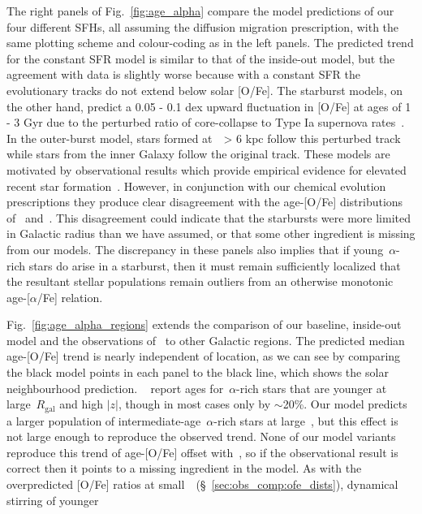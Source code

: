 \documentclass[draft2.tex]{subfiles}
\begin{document}
The right panels of Fig.~\ref{fig:age_alpha} compare the model predictions of 
our four different SFHs, all assuming the diffusion migration prescription, 
with the same plotting scheme and colour-coding as in the left panels. 
The predicted trend for the constant SFR model is similar to that of the 
inside-out model, but the agreement with data is slightly worse because with a 
constant SFR the evolutionary tracks do not extend below solar [O/Fe]. 
The starburst models, on the other hand, predict a 0.05 - 0.1 dex upward 
fluctuation in [O/Fe] at ages of 1 - 3 Gyr due to the perturbed ratio of 
core-collapse to Type Ia supernova rates~\citep{Johnson2020}. 
In the outer-burst model, stars formed at~\rgal~> 6 kpc follow this perturbed 
track while stars from the inner Galaxy follow the original track. 
These models are motivated by observational results which provide empirical 
evidence for elevated recent star formation~\citep{Mor2019, Isern2019}. 
However, in conjunction with our chemical evolution prescriptions they produce 
clear disagreement with the age-[O/Fe] distributions of~\citet{Feuillet2019} 
and~\citet{Miglio2021}. 
This disagreement could indicate that the starbursts were more limited in 
Galactic radius than we have assumed, or that some other ingredient is missing 
from our models. 
The discrepancy in these panels also implies that if young~$\alpha$-rich stars 
do arise in a starburst, then it must remain sufficiently localized that the 
resultant stellar populations remain outliers from an otherwise monotonic 
age-[$\alpha$/Fe] relation. 
\par 
Fig.~\ref{fig:age_alpha_regions} extends the comparison of our baseline, 
inside-out model and the observations of~\citet{Feuillet2019} to other 
Galactic regions. 
The predicted median age-[O/Fe] trend is nearly independent of location, as we 
can see by comparing the black model points in each panel to the black line, 
which shows the solar neighbourhood prediction. 
~\citet{Feuillet2019} report ages for~$\alpha$-rich stars that are younger at 
large~$R_\text{gal}$ and high $\left|z\right|$, though in most cases only by 
$\sim$20\%. 
Our model predicts a larger population of intermediate-age~$\alpha$-rich stars 
at large~\rgal, but this effect is not large enough to reproduce the observed 
trend. 
None of our model variants reproduce this trend of age-[O/Fe] offset with~\absz, 
so if the observational result is correct then it points to a missing 
ingredient in the model. 
As with the overpredicted [O/Fe] ratios at 
small~\rgal~(\S~\ref{sec:obs_comp:ofe_dists}), dynamical stirring of younger 
\end{document}
